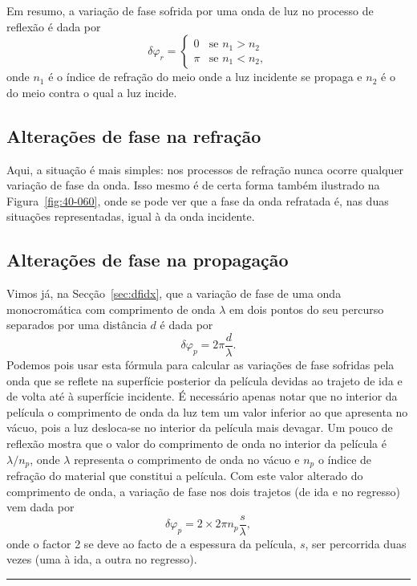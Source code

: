 Em resumo, a variação de fase sofrida por uma onda de luz no processo de
reflexão é dada por
\begin{equation*}
\delta\varphi_r = 
\begin{cases}
    0&\text{se } n_1>n_2\\
    \pi&\text{se } n_1<n_2,
\end{cases}
\end{equation*}
onde $n_1$ é o índice de refração do meio onde a luz incidente se propaga e
$n_2$ é o do meio contra o qual a luz incide.


\subsection*{Alterações de fase na refração}
Aqui, a situação é mais simples: nos processos de refração nunca ocorre qualquer
variação de fase da onda. Isso mesmo é de certa forma também ilustrado na
Figura~\ref{fig:40-060}, onde se pode ver que a fase da onda refratada é, nas
duas situações representadas, igual à da onda incidente.

\subsection*{Alterações de fase na propagação}
Vimos já, na Secção~\ref{sec:dfidx}, que a variação de fase de uma onda
monocromática com comprimento de onda $\lambda$ em dois pontos do seu percurso
separados por uma distância $d$ é dada por
\begin{equation*}
    \delta\varphi_p=2\pi\frac{d}{\lambda}.
\end{equation*}
Podemos pois usar esta fórmula para calcular as variações de fase sofridas pela
onda que se reflete na superfície posterior da película devidas ao trajeto de
ida e de volta até à superfície incidente. É necessário apenas notar que no
interior da película o comprimento de onda da luz tem um valor inferior ao que
apresenta no vácuo, pois a luz desloca-se no interior da película mais devagar.
Um pouco de reflexão mostra que o valor do comprimento de onda no interior da
película é $\lambda/n_p$, onde $\lambda$ representa o comprimento de onda no
vácuo e $n_p$ o índice de refração do material que constitui a película. Com
este valor alterado do comprimento de onda, a variação de fase nos dois
trajetos (de ida e no regresso) vem dada por
\begin{equation*}
\delta\varphi_p=2\times2\pi n_p\frac{s}{\lambda},
\end{equation*}
onde o factor 2 se deve ao facto de a espessura da película, $s$, ser percorrida
duas vezes (uma à ida, a outra no regresso).
\begin{center}
    \rule{2cm}{0.1mm}
\end{center}

